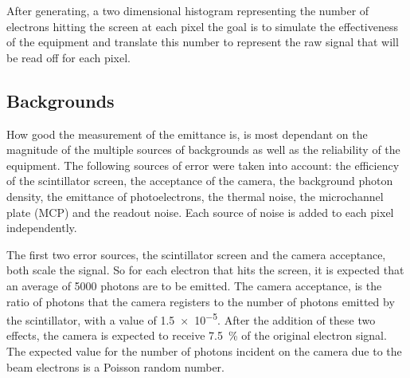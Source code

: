
After generating, a two dimensional histogram representing the number of
electrons hitting the screen at each pixel the goal is to simulate the
effectiveness of the equipment and translate this number to represent the raw
signal that will be read off for each pixel.

\subsection{Backgrounds}

How good the measurement of the emittance is, is most dependant on the magnitude
of the multiple sources of backgrounds as well as the reliability of the
equipment. The following sources of error were taken into account: the
efficiency of the scintillator screen, the acceptance of the camera, the
background photon density, the emittance of photoelectrons, the thermal noise,
the microchannel plate (MCP) and the readout noise. Each source of noise is
added to each pixel independently.


The first two error sources, the scintillator screen and the camera acceptance,
both scale the signal. So for each electron that hits the screen, it is
expected that an average of \num{5000} \cite{} photons are to be emitted. The
camera acceptance, is the ratio of photons that the camera registers to the
number of photons emitted by the scintillator, with a value of \num{1.5e-5}.
After the addition of these two effects, the camera is expected to receive
\SI{7.5}{\percent} of the original electron signal. The expected value for the
number of photons incident on the camera due to the beam electrons is a Poisson
random number.

